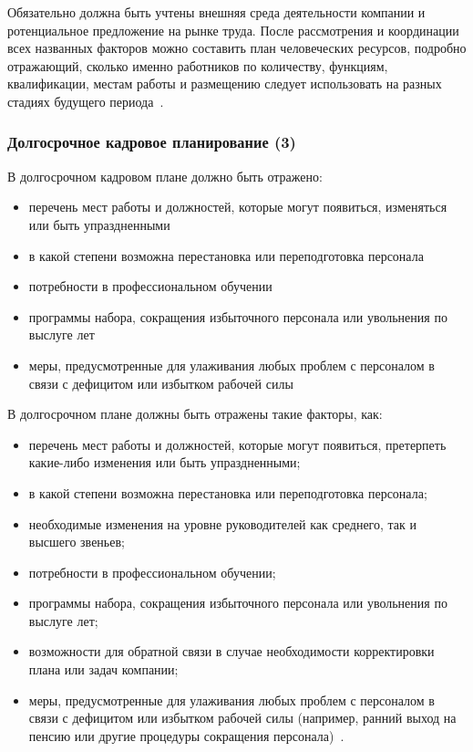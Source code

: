 \documentclass{../industrial-development}
\begin{document}
	\lecturenotes
	
	Обязательно должна быть учтены внешняя среда деятельности компании и ротенциальное предложение на рынке труда. После рассмотрения и координации всех названных факторов можно составить план человеческих ресурсов, подробно отражающий, сколько именно работников по количеству, функциям, квалификации, местам работы и размещению следует использовать на разных стадиях будущего периода~\cite[с.~86]{Ivanova}.
	
	\begin{frame} \frametitle{Долгосрочное кадровое планирование (3)}
		
		В долгосрочном кадровом плане должно быть отражено:
		\begin{itemize}
			\item	перечень мест работы и должностей, которые могут появиться, изменяться или быть упраздненными
			\item	в какой степени возможна перестановка или переподготовка персонала
			\item	потребности в профессиональном обучении
			\item	программы набора, сокращения избыточного персонала или увольнения по выслуге лет
			\item меры, предусмотренные для улаживания любых проблем с персоналом в связи с дефицитом или избытком рабочей силы 
		\end{itemize}
	\end{frame}
	
	\lecturenotes
	
	В долгосрочном плане должны быть отражены такие факторы, как:
	\begin{itemize}
		\item перечень мест работы и должностей, которые могут появиться, претерпеть какие-либо изменения или быть упраздненными;
		
		\item в какой степени возможна перестановка или переподготовка персонала;
		
		\item необходимые изменения на уровне руководителей как среднего, так и высшего звеньев;
		
		\item потребности в профессиональном обучении;
		
		\item программы набора, сокращения избыточного персонала или увольнения по выслуге лет;
		
		\item возможности для обратной связи в случае необходимости корректировки плана или задач компании;
		
		\item меры, предусмотренные для улаживания любых проблем с персоналом в связи с дефицитом или избытком рабочей силы (например, ранний выход на пенсию или другие процедуры сокращения персонала)~\cite[с.~86--87]{Ivanova}.
	\end{itemize}
	
\end{document}
